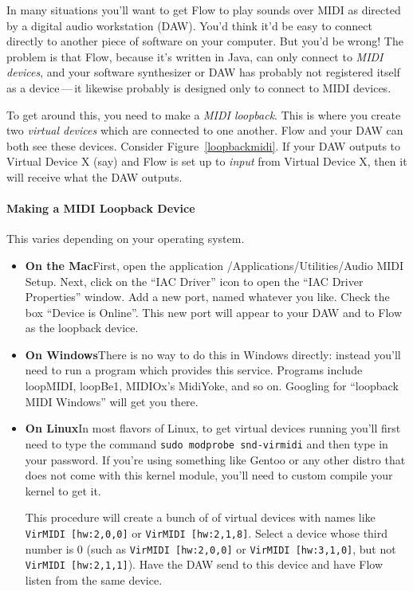\documentclass{article}
\newcommand\name{Flow}
\begin{document}
In many situations you'll want to get {\name} to play sounds over MIDI  as directed by a digital audio workstation (DAW).   You'd think it'd be easy to connect directly to another piece of software on your computer.  But you'd be wrong!  The problem is that {\name}, because it's written in Java, can only connect to {\it MIDI devices}, and your software synthesizer or DAW has probably not registered itself as a device\,---\,it likewise probably is designed only to connect to MIDI devices.

To get around this, you need to make a {\it MIDI loopback}.  This is where you create two {\it virtual devices} which are connected to one another.  {\name} and your DAW can both see these devices.  Consider Figure~\ref{loopbackmidi}.  If your DAW outputs to Virtual Device X (say) and {\name} is set up to {\it input} from Virtual Device X, then it will receive what the DAW outputs.

\paragraph{Making a MIDI Loopback Device}  This varies depending on your operating system.

\begin{itemize}
\item {\bf On the Mac}\quad First, open the application \textsf{/Applications/Utilities/Audio MIDI Setup}.  Next, click on the ``IAC Driver'' icon to open the ``IAC Driver Properties'' window.  Add a new port, named whatever you like.  Check the box ``Device is Online''.  This new port will appear to your DAW and to {\name} as the loopback device.

\item {\bf On Windows}\quad There is no way to do this in Windows directly: instead you'll need to run a program which provides this service.  Programs include {\sf loopMIDI},  {\sf loopBe1}, MIDIOx's {\sf MidiYoke}, and so on.  Googling for ``loopback MIDI Windows'' will get you there. 

\item {\bf On Linux}\quad In most flavors of Linux, to get virtual devices running you'll first need to type the command \hbox{\tt sudo modprobe snd-virmidi} and then type in your password.  \quad If you're using something like Gentoo or any other distro that does not come with this kernel module, you'll need to custom compile your kernel to get it. 

This procedure will create a bunch of of virtual devices with names like {\tt VirMIDI [hw:2,0,0]} or {\tt VirMIDI [hw:2,1,8]}.  Select a device whose third number is 0 (such as {\tt VirMIDI [hw:2,0,0]} or {\tt VirMIDI [hw:3,1,0]}, but not {\tt VirMIDI [hw:2,1,1]}).  Have the DAW send to this device and have {\name} listen from the same device.
\end{itemize}
\end{document}
